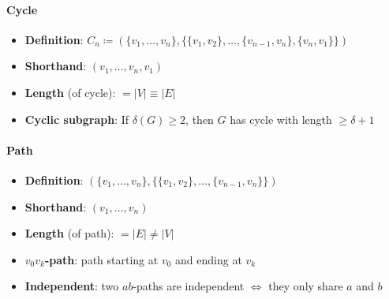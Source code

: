 \paragraph{Cycle}
\begin{itemize}
  \item \textbf{Definition}: $ C_n \coloneqq (\{ v_1, \dots, v_n \}, \{ \{ v_1, v_2 \},\dots,\{ v_{n-1},v_n \},\{ v_n, v_1 \} \}) $
  \item \textbf{Shorthand}: $ (v_1, \dots, v_n, v_1) $
  \item \textbf{Length} (of cycle): $ = \vert V \vert \equiv \vert E \vert $
  \item \textbf{Cyclic subgraph}: If $ \delta(G) \geq 2 $, then $ G $ has cycle with length $ \geq \delta + 1 $
\end{itemize}

\paragraph{Path}
\begin{itemize}
  \item \textbf{Definition}: $ (\{ v_1, \dots, v_n \}, \{ \{ v_1, v_2 \}, \dots, \{ v_{n-1},v_n \} \}) $
  \item \textbf{Shorthand}: $ (v_1, \dots, v_n) $
  \item \textbf{Length} (of path): $ = \vert E \vert \neq \vert V \vert $
  \item \textbf{$ v_0v_k $-path}: path starting at $ v_0 $ and ending at $ v_k $
  \item \textbf{Independent}: two $ ab $-paths are independent $ \Leftrightarrow $ they only share $ a $ and $ b $
\end{itemize}

